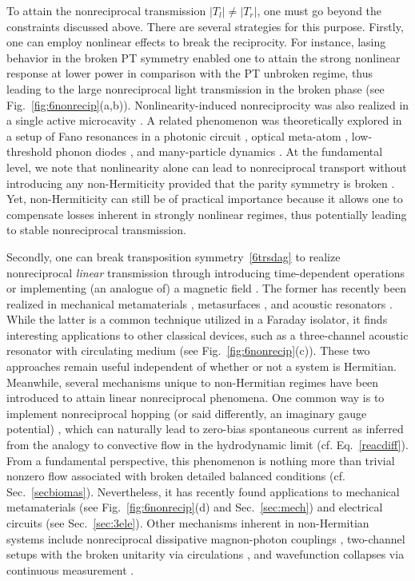 \documentclass{tADP2e}
\theoremstyle{plain}
\theoremstyle{plain}
\theoremstyle{definition}
\begin{document}
To attain the nonreciprocal transmission $|T_l|\neq|T_r|$, one must go beyond the constraints discussed above. There are several strategies for this purpose. 
Firstly, one can employ nonlinear effects to break the reciprocity. For instance, lasing behavior in the broken PT symmetry enabled one to attain the strong nonlinear response at lower power in comparison with the PT unbroken regime, thus leading to the large nonreciprocal light transmission in the broken phase \cite{RH10,CL14,BP14} (see Fig.~\ref{fig:6nonrecip}(a,b)). Nonlinearity-induced nonreciprocity was also realized in a single active microcavity \cite{JX16}.  A related phenomenon was theoretically explored in a setup of Fano resonances in a photonic circuit \cite{Nazari:14}, optical meta-atom \cite{LS152}, low-threshold phonon diodes \cite{ZJ152}, and many-particle dynamics \cite{YA18}.  
At the fundamental level, we note that nonlinearity alone can lead to nonreciprocal transport without introducing any non-Hermiticity provided that the parity symmetry is broken \cite{LB09,LF143,CC16,TY182}. Yet, non-Hermiticity can still be of practical importance because it allows one to compensate losses inherent in strongly nonlinear regimes, thus potentially leading to stable nonreciprocal transmission.


 
Secondly, one can break transposition symmetry~\eqref{6trsdag} to realize nonreciprocal {\it linear} transmission through introducing time-dependent operations \cite{HY15,Shaltout:15} or implementing (an analogue of) a magnetic field  \cite{RP97}. The former has recently been realized in mechanical metamaterials \cite{WY18,TG19}, metasurfaces \cite{TG19}, and  acoustic resonators \cite{WQ15}. While the latter is a common technique  utilized in a Faraday isolator, it finds interesting applications to other classical devices, such as a three-channel acoustic resonator with  circulating medium \cite{Fleury516} (see Fig.~\ref{fig:6nonrecip}(c)). These two approaches remain useful independent of whether or not a system is Hermitian. Meanwhile, several mechanisms unique to non-Hermitian regimes have been introduced to attain linear nonreciprocal phenomena. One common way is to implement nonreciprocal hopping (or said differently, an imaginary gauge potential) \cite{HN96}, which can naturally lead to zero-bias spontaneous current as inferred from the analogy to convective flow in the hydrodynamic limit (cf. Eq.~\eqref{reacdiff}). From a fundamental perspective, this phenomenon is nothing more than trivial nonzero  flow associated with broken detailed balanced conditions \cite{US12b,JJH15} (cf. Sec.~\ref{secbiomas}). Nevertheless, it has recently found applications to mechanical metamaterials \cite{BM19,GA19} (see Fig.~\ref{fig:6nonrecip}(d) and Sec.~\ref{sec:mech}) and electrical circuits \cite{ZQB20} (see Sec.~\ref{sec:3ele}). 
Other mechanisms inherent in non-Hermitian systems include nonreciprocal dissipative magnon-photon couplings \cite{WYP19}, two-channel setups with the broken unitarity via circulations \cite{MS18,ZH20}, and wavefunction collapses via continuous measurement \cite{BP19}.
\end{document}
